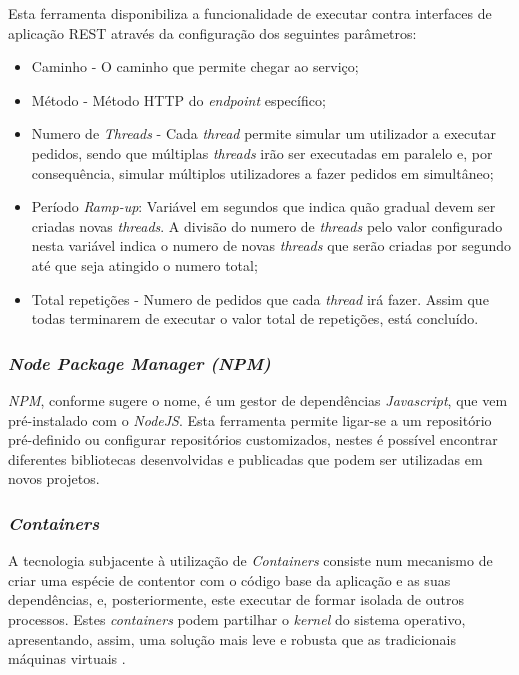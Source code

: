 Esta ferramenta disponibiliza a funcionalidade de executar contra interfaces de aplicação REST através da configuração dos seguintes parâmetros\cite{jmeter}:
\begin{itemize}
    \item Caminho - O caminho que permite chegar ao serviço;
    \item Método - Método HTTP do \emph{endpoint} específico;
    \item Numero de \emph{Threads} - Cada \emph{thread} permite simular um utilizador a executar pedidos, sendo que múltiplas \emph{threads} irão ser executadas em paralelo e, por consequência, simular múltiplos utilizadores a fazer pedidos em simultâneo;
    \item Período \emph{Ramp-up}: Variável em segundos que indica quão gradual devem ser criadas novas \emph{threads}. A divisão do numero de \emph{threads} pelo valor configurado nesta variável indica o numero de novas \emph{threads} que serão criadas por segundo até que seja atingido o numero total;
    \item Total repetições - Numero de pedidos que cada \emph{thread} irá fazer. Assim que todas terminarem de executar o valor total de repetições, está concluído.
\end{itemize}

\subsubsection{\emph{Node Package Manager (NPM) \label{sym:npm}}\label{estado_arte_npm}}
\emph{NPM}, conforme sugere o nome, é um gestor de dependências \emph{Javascript}, que vem pré-instalado com o \emph{NodeJS}.
Esta ferramenta permite ligar-se a um repositório pré-definido ou configurar repositórios customizados, nestes é possível encontrar diferentes bibliotecas desenvolvidas e publicadas que podem ser utilizadas em novos projetos\cite{npm_explanation}.

\subsubsection{\emph{Containers} \label{estado_arte_containers}}
A tecnologia subjacente à utilização de \emph{Containers} consiste num mecanismo de criar uma espécie de contentor com o código base da aplicação e as suas dependências, e, posteriormente, este executar de formar isolada de outros processos.
Estes \emph{containers} podem partilhar o \emph{kernel} do sistema operativo, apresentando, assim, uma solução mais leve e robusta que as tradicionais máquinas virtuais \cite{techradar_containers}.






